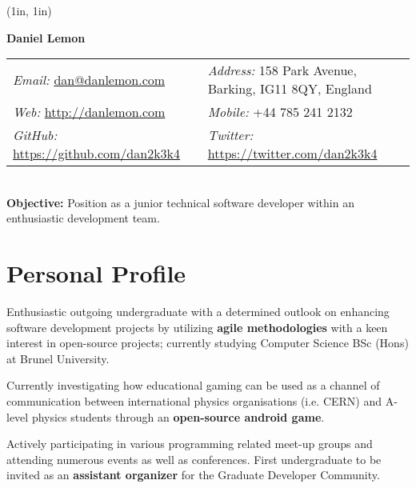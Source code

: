 \documentclass[final,a4paper,notitlepage,10pt]{report}
\makeatletter
\newcommand{\mailto}[1]{\href{mailto:#1}{#1}}
\newcommand{\name}{Daniel Lemon}
\newcommand{\addr}{158 Park Avenue, Barking, IG11 8QY, England}
\newcommand{\phone}{+44 785 241 2132}
\newcommand{\email}{\mailto{dan@danlemon.com}}
\newcommand{\website}{\href{http://danlemon.com}{http://danlemon.com}}
\newcommand{\github}{\href{https://github.com/dan2k3k4}{https://github.com/dan2k3k4}}
\newcommand{\twitter}{\href{https://twitter.com/dan2k3k4}{https://twitter.com/dan2k3k4}}
\makeatother
\begin{document}
\begin{minipage}[t]{\textwidth}
	\begin{minipage}{1in}
	\begin{pspicture}(1in, 1in)
	\end{pspicture}
	\end{minipage}\hspace{0.6cm}%
	\begin{minipage}{0.85\textwidth}
	\textbf{\LARGE \qquad \name }

	\begin{tabular*}{\textwidth}{@{} p{} l}\\
	\textit{Email:} \email\ & \textit{Address:} \addr \\
	\textit{Web:} \website\ & \textit{Mobile:} \phone \\
	\textit{GitHub:} \github\ & \textit{Twitter:} \twitter \\
	\end{tabular*}\\
	
	\textbf{Objective:} Position as a junior technical software developer within an enthusiastic development team.\\
	\end{minipage}
\end{minipage}

\section*{Personal Profile {\hfill\raisebox{.5ex}{\makebox[.65\textwidth]{\hrulefill}}}}
\begin{compactitemize}
\item Enthusiastic outgoing undergraduate with a determined outlook on enhancing software development projects by utilizing \textbf{agile methodologies} with a keen interest in open-source projects; currently studying Computer Science BSc (Hons) at Brunel University.

\item Currently investigating how educational gaming can be used as a channel of communication between international physics organisations (i.e. CERN) and A-level physics students through an \textbf{open-source android game}.

\item Actively participating in various programming related meet-up groups and attending numerous events as well as conferences. First undergraduate to be invited as an \textbf{assistant organizer} for the Graduate Developer Community.
\end{compactitemize}
\end{document}
